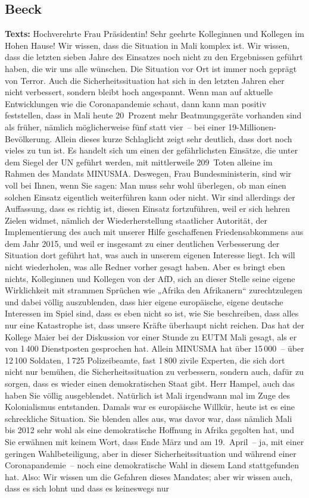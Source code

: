 \documentclass{article}
\begin{document}
\subsection{Beeck}
\noindent\textbf{Texts:} Hochverehrte Frau Präsidentin! Sehr geehrte Kolleginnen und Kollegen im Hohen Hause! Wir wissen, dass die Situation in Mali komplex ist. Wir wissen, dass die letzten sieben Jahre des Einsatzes noch nicht zu den Ergebnissen geführt haben, die wir uns alle wünschen. Die Situation vor Ort ist immer noch geprägt von Terror. Auch die Sicherheitssituation hat sich in den letzten Jahren eher nicht verbessert, sondern bleibt hoch angespannt. Wenn man auf aktuelle Entwicklungen wie die Coronapandemie schaut, dann kann man positiv feststellen, dass in Mali heute 20 Prozent mehr Beatmungsgeräte vorhanden sind als früher, nämlich möglicherweise fünf statt vier – bei einer 19-Millionen-Bevölkerung. Allein dieses kurze Schlaglicht zeigt sehr deutlich, dass dort noch vieles zu tun ist. Es handelt sich um einen der gefährlichsten Einsätze, die unter dem Siegel der UN geführt werden, mit mittlerweile 209 Toten alleine im Rahmen des Mandats MINUSMA. Deswegen, Frau Bundesministerin, sind wir voll bei Ihnen, wenn Sie sagen: Man muss sehr wohl überlegen, ob man einen solchen Einsatz eigentlich weiterführen kann oder nicht.  Wir sind allerdings der Auffassung, dass es richtig ist, diesen Einsatz fortzuführen, weil er sich hehren Zielen widmet, nämlich der Wiederherstellung staatlicher Autorität, der Implementierung des auch mit unserer Hilfe geschaffenen Friedensabkommens aus dem Jahr 2015, und weil er insgesamt zu einer deutlichen Verbesserung der Situation dort geführt hat, was auch in unserem eigenen Interesse liegt. Ich will nicht wiederholen, was alle Redner vorher gesagt haben. Aber es bringt eben nichts, Kolleginnen und Kollegen von der AfD, sich an dieser Stelle seine eigene Wirklichkeit mit strammen Sprüchen wie „Afrika den Afrikanern“ zurechtzulegen  und dabei völlig auszublenden, dass hier eigene europäische, eigene deutsche Interessen im Spiel sind, dass es eben nicht so ist, wie Sie beschreiben, dass alles nur eine Katastrophe ist, dass unsere Kräfte überhaupt nicht reichen. Das hat der Kollege Maier bei der Diskussion vor einer Stunde zu EUTM Mali gesagt, als er von 1 400 Dienstposten gesprochen hat. Allein MINUSMA hat über 15 000 – über 12 100 Soldaten, 1 725 Polizeibeamte, fast 1 800 zivile Experten, die sich dort nicht nur bemühen, die Sicherheitssituation zu verbessern, sondern auch, dafür zu sorgen, dass es wieder einen demokratischen Staat gibt. Herr Hampel, auch das haben Sie völlig ausgeblendet. Natürlich ist Mali irgendwann mal im Zuge des Kolonialismus entstanden. Damals war es europäische Willkür, heute ist es eine schreckliche Situation. Sie blenden alles aus, was davor war, dass nämlich Mali bis 2012 sehr wohl als eine demokratische Hoffnung in Afrika gegolten hat, und Sie erwähnen mit keinem Wort, dass Ende März und am 19. April – ja, mit einer geringen Wahlbeteiligung, aber in dieser Sicherheitssituation und während einer Coronapandemie – noch eine demokratische Wahl in diesem Land stattgefunden hat. Also: Wir wissen um die Gefahren dieses Mandates; aber wir wissen auch, dass es sich lohnt und dass es keineswegs nur 
\end{document}
